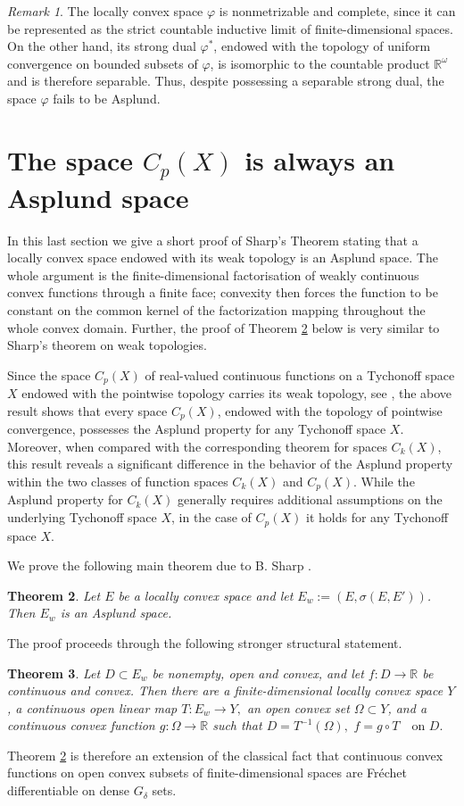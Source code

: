 \documentclass[12pt]{amsart}
\theoremstyle{plain}
\newtheorem{theorem}{Theorem}[section]
\theoremstyle{definition}
\theoremstyle{remark}
\newtheorem{remark}[theorem]{Remark}
\def\R{{\mathbb R}}
\begin{document}
\begin{remark}
The locally convex space $\varphi$ is nonmetrizable and complete, since it can be represented as the strict countable inductive limit of finite-dimensional spaces. On the other hand, its strong dual $\varphi^{*}$, endowed with the topology of uniform convergence on bounded subsets of $\varphi$, is isomorphic to the countable product $\mathbb{R}^{\omega}$ and is therefore separable. Thus, despite possessing a separable strong dual, the space $\varphi$ fails to be Asplund.
\end{remark}
\section{The space $C_p(X)$  is always an Asplund space}
In this last section  we  give a short proof of Sharp's  Theorem  \cite[Theorem 5.5]{s} stating that a locally convex space endowed with its weak topology is an  Asplund space.  The whole argument is the finite-dimensional factorisation of weakly continuous convex functions through a finite face; convexity then forces the function to be constant on the common kernel of the factorization mapping throughout the whole convex domain.
Further, the proof of Theorem \ref{sharp} below is very similar to Sharp's theorem on weak topologies.

Since the space $C_p(X)$ of real-valued continuous functions on a Tychonoff space $X$  endowed with the pointwise topology carries its weak topology, see \cite[Section I.2]{Schmets}, the above result shows  that every space $C_p(X)$, endowed with the topology of pointwise convergence, possesses the Asplund property for any Tychonoff space $X$.  Moreover, when compared with the corresponding theorem for spaces $C_k(X)$, this result reveals a significant difference in the behavior of the Asplund property within the two classes of function spaces $C_k(X)$ and $C_p(X)$. While the Asplund property for $C_k(X)$ generally requires additional assumptions on the underlying Tychonoff space $X$, in the case of $C_p(X)$ it holds for any  Tychonoff  space $X$.

We prove the following main theorem due to B. Sharp \cite[Theorem 5.5]{s}.
\begin{theorem}\label{sharp}
Let $E$ be a locally convex space and let $E_{w}:=(E,\sigma(E,E'))$.  Then $E_{w}$ is an Asplund space.
\end{theorem}
The proof proceeds through the following stronger structural statement.
\begin{theorem}\label{sharp2}
Let $D\subset E_{w}$ be nonempty, open and convex, and let $f\colon D\to\R$ be continuous and convex.  Then there are a finite-dimensional locally convex space $Y$, a continuous open linear map
$T\colon E_{w}\longrightarrow Y,$ an open convex set $\Omega\subset Y$, and a continuous convex function $g\colon\Omega\to\R$ such that
$D=T^{-1}(\Omega),\,\,f=g\circ T\quad\text{on }D.$
\end{theorem}
Theorem \ref{sharp} is therefore an extension of the classical  fact that continuous convex functions on open convex subsets of finite-dimensional spaces are Fr\'echet differentiable on dense $G_\delta$ sets.
\end{document}
